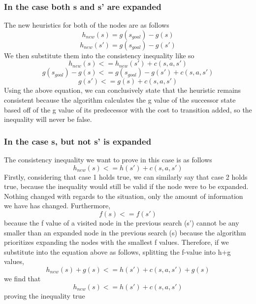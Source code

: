 \documentclass{article}
\begin{document}
\subsubsection{In the case both s and s' are expanded}
The new heuristics for both of the nodes are as follows
\begin{equation}
h_{new}(s) = g(s_{goal})-g(s)
\end{equation}
\begin{equation}
h_{new}(s') = g(s_{goal})-g(s')
\end{equation}
We then substitute them into the consistency inequality like so
\begin{equation}
h_{new}(s) <= h_{new}(s')+c(s,a,s')
\end{equation}
\begin{equation}
g(s_{goal}) - g(s) <= g(s_{goal}) - g(s') + c(s,a,s')
\end{equation}
\begin{equation}
g(s') <= g(s) + c(s,a,s')
\end{equation}
Using the above equation, we can conclusively state that the heuristic remains consistent because the algorithm calculates the g value of the successor state based off of the g value of its predecessor with the cost to transition added, so the inequality will never be false.
\subsubsection{In the case s, but not s' is expanded}
The consistency inequality we want to prove in this case is as follows
\begin{equation}
h_{new}(s) <= h(s') + c(s,a,s')
\end{equation}
Firstly, considering that case 1 holds true, we can similarly say that case 2 holds true, because the inequality would still be valid if the node were to be expanded. Nothing changed with regards to the situation, only the amount of information we have has changed. 
Furthermore,
\begin{equation}
f(s) <= f(s')
\end{equation}
because the f value of a visited node in the previous search (s') cannot be any smaller than an expanded node in the previous search (s) because the algorithm prioritizes expanding the nodes with the smallest f values. Therefore, if we substitute into the equation above as follows, splitting the f-value into h+g values,
\begin{equation}
	h_{new}(s) + g(s) <= h(s') + c(s,a,s') + g(s)
\end{equation}
we find that 
\begin{equation}
h_{new}(s) <= h(s') + c(s,a,s')
\end{equation}
proving the inequality true
\end{document}
